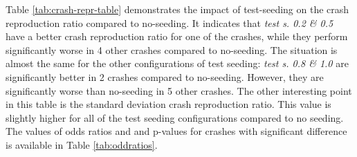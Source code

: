  

Table \ref{tab:crash-repr-table} demonstrates the impact of test-seeding on the crash reproduction ratio compared to no-seeding. It indicates that \textit{test s. 0.2 \& 0.5} have a better crash reproduction ratio for one of the crashes, while they perform significantly worse in 4 other crashes compared to no-seeding. The situation is almost the same for the other configurations of test seeding: \textit{test s. 0.8 \& 1.0} are significantly better in 2 crashes compared to no-seeding. However, they are significantly worse than no-seeding in 5 other crashes. The other interesting point in this table is the standard deviation crash reproduction ratio. This value is slightly higher for all of the test seeding configurations compared to no seeding. The values of odds ratios and and p-values for crashes with significant difference is available in Table \ref{tab:oddratios}.

